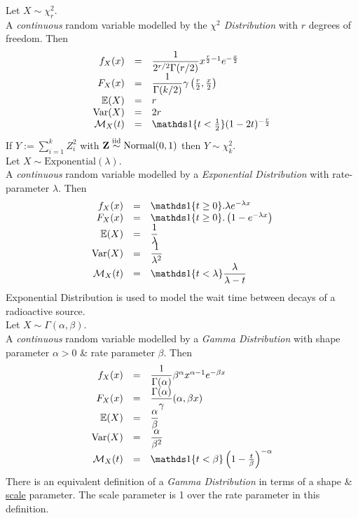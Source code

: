 \documentclass[11pt,a4paper]{article}
\begin{document}
Let $X\sim\chi^2_r$.\\
A \textit{continuous} random variable modelled by the \textit{$\chi^2$ Distribution} with $r$ degrees of freedom. Then
\[\begin{array}{rcl}
f_X(x)&=&\dfrac{1}{2^{r/2}\Gamma(r/2)}x^{\frac{r}{2}-1}e^{-\frac{x}{2}}\\
F_X(x)&=&\dfrac{1}{\Gamma(k/2)}\gamma\left(\frac{r}{2},\frac{x}{2}\right)\\
\expect(X)&=&r\\
\var(X)&=&2r\\
\mathcal{M}_X(t)&=&\indicator\{t<\frac{1}{2}\}(1-2t)^{-\frac{r}{2}}
\end{array}\]
\nb If $Y:=\sum_{i=1}^kZ_i^2$ with $\textbf{Z}\overset{\text{iid}}{\sim}\text{Normal}(0,1)$ then $Y\sim\chi^2_k$.\\

Let $X\sim\text{Exponential}(\lambda)$.\\
A \textit{continuous} random variable modelled by a \textit{Exponential Distribution} with rate-parameter $\lambda$. Then
\[\begin{array}{rcl}
f_X(x)&=&\indicator\{t\geq0\}.\lambda e^{-\lambda x}\\
F_X(x)&=&\indicator\{t\geq0\}.\left(1-e^{-\lambda x}\right)\\
\expect(X)&=&\dfrac{1}{\lambda}\\
\var(X)&=&\dfrac{1}{\lambda^2}\\
\mathcal{M}_X(t)&=&\indicator\{t<\lambda\}\dfrac{\lambda}{\lambda-t}
\end{array}\]
\nb Exponential Distribution is used to model the wait time between decays of a radioactive source.\\

Let $X\sim\Gamma(\alpha,\beta)$.\\
A \textit{continuous} random variable modelled by a \textit{Gamma Distribution} with shape parameter $\alpha>0$ \& rate parameter $\beta$. Then
\[\begin{array}{rcll}
f_X(x)&=&\dfrac{1}{\Gamma(\alpha)}\beta^\alpha x^{\alpha-1}e^{-\beta x}\\
F_X(x)&=&\dfrac{\Gamma(\alpha)}\gamma(\alpha,\beta x)\\
\expect(X)&=&\dfrac{\alpha}{\beta}\\
\var(X)&=&\dfrac{\alpha}{\beta^2}\\
\mathcal{M}_X(t)&=&\indicator\{t<\beta\}\left(1-\frac{t}{\beta}\right)^{-\alpha}
\end{array}\]
\nb There is an equivalent definition of a \textit{Gamma Distribution} in terms of a shape \& \underline{scale} parameter. The scale parameter is 1 over the rate parameter in this definition.\\
\end{document}
